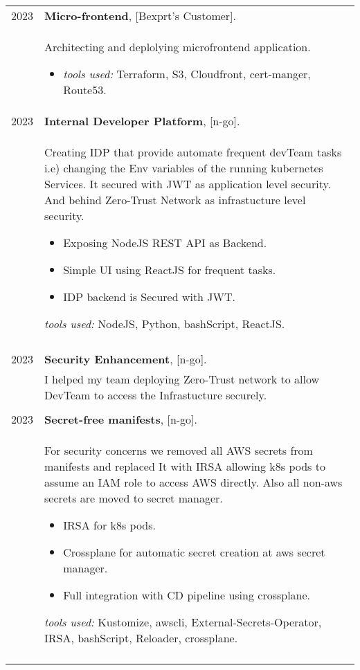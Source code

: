 \documentclass[a4paper,10pt]{article}
\begin{document}
\begin{longtable}{r p{16cm}}
        2023  & \textbf{Micro-frontend}, [Bexprt's Customer].\\&
        Architecting and deplolying microfrontend application.
        \begin{itemize}
            \item \textit{tools used: } Terraform, S3, Cloudfront, cert-manger, Route53.
        \end{itemize}\\
   

        2023  & \textbf{Internal Developer Platform}, [n-go].\\&
        Creating IDP that provide automate frequent devTeam tasks i.e) changing the Env variables of the running kubernetes Services. It secured with JWT as application level security. And behind Zero-Trust Network as infrastucture level security.
        \begin{itemize}
            \item Exposing NodeJS REST API as Backend. 
            \item Simple UI using ReactJS for frequent tasks. 
            \item IDP backend is Secured with JWT. 
        \end{itemize}
        \textit{tools used: } NodeJS, Python, bashScript, ReactJS.\\
        &\\ 

        2023  & \textbf{Security Enhancement}, [n-go].\\&
        I helped my team deploying Zero-Trust network to allow  DevTeam to access the Infrastucture securely. \\
        &\\ 

        2023  & \textbf{Secret-free manifests}, [n-go].\\&
        For security concerns we removed all AWS secrets from manifests and replaced It with IRSA allowing k8s pods to assume an IAM role to access AWS directly. Also all non-aws secrets are moved to secret manager. 
        \begin{itemize}
            \item IRSA for k8s pods.
            \item Crossplane for automatic secret creation at aws secret manager.
            \item Full integration with CD pipeline using crossplane. 
        \end{itemize}
        \textit{tools used: } Kustomize, awscli, External-Secrets-Operator, IRSA, bashScript, Reloader, crossplane.\\
        &\\ 


\end{longtable}
\end{document}
